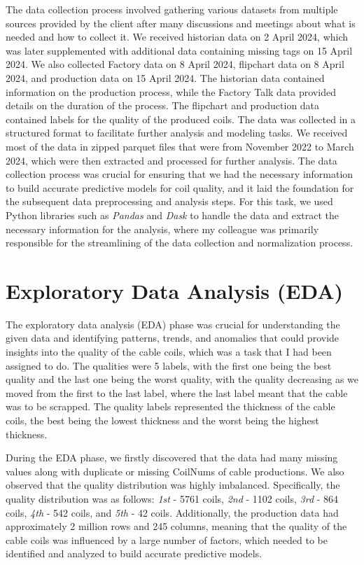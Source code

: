 The data collection process involved gathering various datasets from multiple
sources provided by the client after many discussions and meetings about what
is needed and how to collect it. We received historian data on 2 April 2024,
which was later supplemented with additional data containing missing tags on 15
April 2024. We also collected Factory data on 8 April 2024, flipchart data on 8
April 2024, and production data on 15 April 2024. The historian data contained
information on the production process, while the Factory Talk data provided
details on the duration of the process. The flipchart and production data
contained labels for the quality of the produced coils. The data was collected
in a structured format to facilitate further analysis and modeling tasks. We
received most of the data in zipped parquet files that were from November 2022
to March 2024, which were then extracted and processed for further analysis.
The data collection process was crucial for ensuring that we had the necessary
information to build accurate predictive models for coil quality, and it laid
the foundation for the subsequent data preprocessing and analysis steps. For
this task, we used Python libraries such as \emph{Pandas} and \emph{Dask} to
handle the data and extract the necessary information for the analysis, where
my colleague was primarily responsible for the streamlining of the data
collection and normalization process.

\section{Exploratory Data Analysis (EDA)}

The exploratory data analysis (EDA) phase was crucial for understanding the
given data and identifying patterns, trends, and anomalies that could provide
insights into the quality of the cable coils, which was a task that I had been
assigned to do. The qualities were 5 labels, with the first one being the best
quality and the last one being the worst quality, with the quality decreasing
as we moved from the first to the last label, where the last label meant that
the cable was to be scrapped. The quality labels represented the thickness of
the cable coils, the best being the lowest thickness and the worst being the
highest thickness.

During the EDA phase, we firstly discovered that the data had many missing
values along with duplicate or missing CoilNums of cable productions. We also
observed that the quality distribution was highly imbalanced. Specifically, the
quality distribution was as follows: \emph{1st} - 5761 coils, \emph{2nd} - 1102
coils, \emph{3rd} - 864 coils, \emph{4th} - 542 coils, and \emph{5th} - 42
coils. Additionally, the production data had approximately 2 million rows and
245 columns, meaning that the quality of the cable coils was influenced by a
large number of factors, which needed to be identified and analyzed to build
accurate predictive models.

